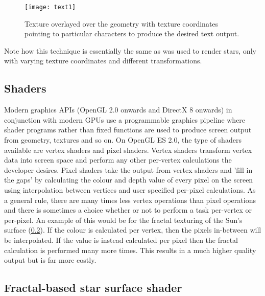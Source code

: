 \begin{figure}[!htbp]
  \begin{center}
    \leavevmode
    \ifpdf
      \texttt{[image: text1]}
    \fi
    \caption{Texture overlayed over the geometry with texture coordinates pointing to particular characters to produce the desired text output.}
    \label{FigText1}
  \end{center}
\end{figure}

Note how this technique is essentially the same as was used to render stars, only with varying texture coordinates and different transformations.

\subsection{Shaders}

Modern graphics APIs (OpenGL 2.0 onwards and DirectX 8 onwards) in conjunction with modern GPUs use a programmable graphics pipeline where shader programs rather than fixed functions are used to produce screen output from geometry, textures and so on. On OpenGL ES 2.0, the type of shaders available are vertex shaders and pixel shaders. Vertex shaders transform vertex data into screen space and perform any other per-vertex calculations the developer desires. Pixel shaders take the output from vertex shaders and 'fill in the gaps' by calculating the colour and depth value of every pixel on the screen using interpolation between vertices and user specified per-pixel calculations. As a general rule, there are many times less vertex operations than pixel operations and there is sometimes a choice whether or not to perform a task per-vertex or per-pixel. An example of this would be for the fractal texturing of the Sun's surface (\cref{fractalstar}). If the colour is calculated per vertex, then the pixels in-between will be interpolated. If the value is instead calculated per pixel then the fractal calculation is performed many more times. This results in a much higher quality output but is far more costly.

\subsection{Fractal-based star surface shader}
\label{fractalstar}

